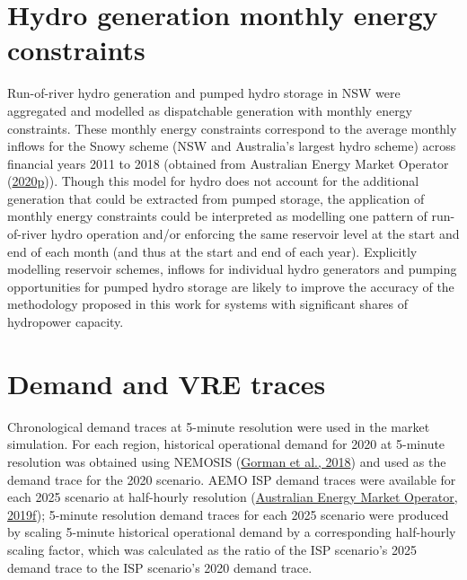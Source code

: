 \documentclass[12pt,a4paper,]{report}
\begin{document}
\hypertarget{hydro-generation-monthly-energy-constraints}{%
\section{Hydro generation monthly energy
constraints}\label{hydro-generation-monthly-energy-constraints}}

Run-of-river hydro generation and pumped hydro storage in NSW were
aggregated and modelled as dispatchable generation with monthly energy
constraints. These monthly energy constraints correspond to the average
monthly inflows for the Snowy scheme (NSW and Australia's largest hydro
scheme) across financial years 2011 to 2018 (obtained from Australian
Energy Market Operator
(\protect\hyperlink{ref-australianenergymarketoperator2020InputsAssumptions2020}{2020p})).
Though this model for hydro does not account for the additional
generation that could be extracted from pumped storage, the application
of monthly energy constraints could be interpreted as modelling one
pattern of run-of-river hydro operation and/or enforcing the same
reservoir level at the start and end of each month (and thus at the
start and end of each year). Explicitly modelling reservoir schemes,
inflows for individual hydro generators and pumping opportunities for
pumped hydro storage are likely to improve the accuracy of the
methodology proposed in this work for systems with significant shares of
hydropower capacity.

\hypertarget{demand-and-vre-traces}{%
\section{Demand and VRE traces}\label{demand-and-vre-traces}}

Chronological demand traces at 5-minute resolution were used in the
market simulation. For each region, historical operational demand for
2020 at 5-minute resolution was obtained using NEMOSIS
(\protect\hyperlink{ref-gormanNEMOSISNEMOpen2018}{Gorman et al., 2018})
and used as the demand trace for the 2020 scenario. AEMO ISP demand
traces were available for each 2025 scenario at half-hourly resolution
(\protect\hyperlink{ref-australianenergymarketoperator2020DraftISP2019a}{Australian
Energy Market Operator, 2019f}); 5-minute resolution demand traces for
each 2025 scenario were produced by scaling 5-minute historical
operational demand by a corresponding half-hourly scaling factor, which
was calculated as the ratio of the ISP scenario's 2025 demand trace to
the ISP scenario's 2020 demand trace.
\end{document}
